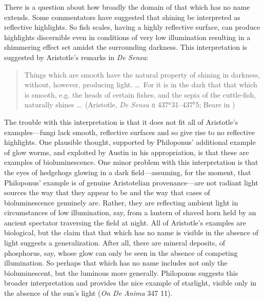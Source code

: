 There is a question about how broadly the domain of that which has no name extends. Some commentators have suggested that shining be interpreted as reflective highlights. So fish scales, having a highly reflective surface, can produce highlights discernible even in conditions of very low illumination resulting in a shimmering effect set amidst the surrounding darkness. This interpretation is suggested by Aristotle's remarks in \emph{De Sensu}: 
\begin{quote}
	Things which are smooth have the natural property of shining in darkness, without, however, producing light. \ldots\ For it is in the dark that that which is smooth, e.g. the heads of certain fishes, and the sepia of the cuttle-fish, naturally shines \ldots\ (Aristotle, \emph{De Sensu} \textsc{ii} 437\( ^{a} \)31--437\( ^{b} \)5; Beare in \citealt[4]{Barnes:1984uq})
\end{quote}
The trouble with this interpretation is that it does not fit all of Aristotle's examples---fungi lack smooth, reflective surfaces and so give rise to no reflective highlights. One plausible thought, supported by Philoponus' additional example of glow worms, and exploited by Austin in his appropriation, is that these are examples of bioluminescence. One minor problem with this interpretation is that the eyes of hedgehogs glowing in a dark field---assuming, for the moment, that Philoponus' example is of genuine Aristotelian provenance---are not radiant light sources the way that they appear to be and the way that cases of  bioluminescence genuinely are. Rather, they are reflecting ambient light in circumstances of low illumination, say, from a lantern of shaved horn held by an ancient spectator traversing the field at night. All of Aristotle's examples are biological, but the claim that that which has no name is visible in the absence of light suggests a generalization. After all, there are mineral deposits, of phosphorus, say, whose glow can only be seen in the absence of competing illumination. So perhaps that which has no name includes not only the bioluminescent, but the luminous more generally. Philoponus suggests this broader interpretation and provides the nice example of starlight, visible only in the absence of the sun's light (\emph{On \emph{De Anima}} 347 11). 

